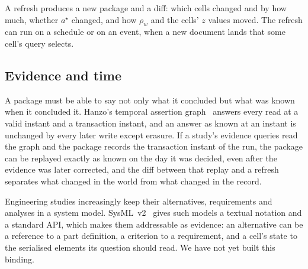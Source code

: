 A refresh produces a new package and a diff: which cells changed and by how
much, whether $a^\star$ changed, and how $\rho_w$ and the cells' $z$ values
moved. The refresh can run on a schedule or on an event, when a new document
lands that some cell's query selects.

\subsection{Evidence and time}

A package must be able to say not only what it concluded but what was known
when it concluded it. Hanzo's temporal assertion graph~\cite{hanzographpaper}
answers every read at a valid instant and a transaction instant, and an answer
as known at an instant is unchanged by every later write except erasure. If a
study's evidence queries read the graph and the package records the
transaction instant of the run, the package can be replayed exactly as known
on the day it was decided, even after the evidence was later corrected, and the
diff between that replay and a refresh separates what changed in the world
from what changed in the record.

Engineering studies increasingly keep their alternatives, requirements and
analyses in a system model. SysML~v2~\cite{sysmlv2} gives such models a
textual notation and a standard API, which makes them addressable as evidence:
an alternative can be a reference to a part definition, a criterion to a
requirement, and a cell's state to the serialised elements its question should
read. We have not yet built this binding.
